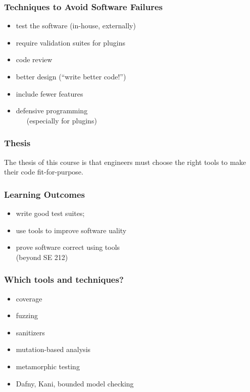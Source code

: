 \documentclass{beamer}
\newenvironment{changemargin}[1]{%
  \begin{list}{}{%
    \setlength{\topsep}{0pt}%
    \setlength{\leftmargin}{#1}%
    \setlength{\rightmargin}{1em}
    \setlength{\listparindent}{\parindent}%
    \setlength{\itemindent}{\parindent}%
    \setlength{\parsep}{\parskip}%
  }%
  \item[]}{\end{list}}
\begin{document}
\begin{frame}
  \frametitle{Techniques to Avoid Software Failures}

  \Large
  \begin{changemargin}{2em}
    \begin{itemize}
   \item test the software (in-house, externally)
   \item require validation suites for plugins
   \item code review
   \item better design (``write better code!'')
   \item include fewer features
   \item defensive programming \\~~~(especially for plugins)
  \end{itemize}
    \end{changemargin}
  
\end{frame}

\begin{frame}
  \frametitle{Thesis}

  \Large
  \begin{changemargin}{2em}
    The thesis of this course is that engineers must choose the right tools to make their code fit-for-purpose.
  \end{changemargin}
\end{frame}

\begin{frame}
  \frametitle{Learning Outcomes}

  \Large
  \begin{changemargin}{2em}
    \begin{itemize}
    \item write good test suites;
    \item use tools to improve software uality
      \item prove software correct using tools \\ \hspace*{5em} (beyond SE 212)
        \end{itemize}
  \end{changemargin}
\end{frame}

\begin{frame}
  \frametitle{Which tools and techniques?}

  \Large
  \begin{changemargin}{2em}
    \begin{itemize}
  \item coverage
  \item fuzzing
  \item sanitizers
  \item mutation-based analysis
  \item metamorphic testing
  \item Dafny, Kani, bounded model checking
    \end{itemize}
  \end{changemargin}
\end{frame}
\end{document}
